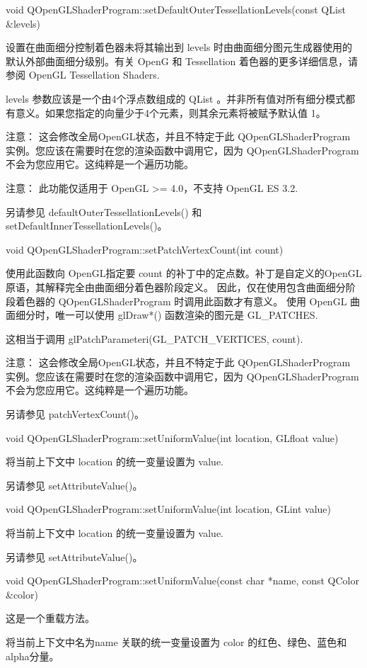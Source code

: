 void QOpenGLShaderProgram::setDefaultOuterTessellationLevels(const QList \&levels)

设置在曲面细分控制着色器未将其输出到 levels 时由曲面细分图元生成器使用的默认外部曲面细分级别。有关 OpenG 和 Tessellation 着色器的更多详细信息，请参阅 OpenGL Tessellation Shaders.

levels 参数应该是一个由4个浮点数组成的 QList 。并非所有值对所有细分模式都有意义。如果您指定的向量少于4个元素，则其余元素将被赋予默认值 1。

注意： 这会修改全局OpenGL状态，并且不特定于此 QOpenGLShaderProgram 实例。您应该在需要时在您的渲染函数中调用它，因为 QOpenGLShaderProgram 不会为您应用它。这纯粹是一个遍历功能。

注意： 此功能仅适用于 OpenGL >= 4.0，不支持 OpenGL ES 3.2.

另请参见 defaultOuterTessellationLevels() 和 setDefaultInnerTessellationLevels()。

void QOpenGLShaderProgram::setPatchVertexCount(int count)

使用此函数向 OpenGL指定要 count 的补丁中的定点数。补丁是自定义的OpenGL原语，其解释完全由曲面细分着色器阶段定义。 因此，仅在使用包含曲面细分阶段着色器的 QOpenGLShaderProgram 时调用此函数才有意义。 使用 OpenGL 曲面细分时，唯一可以使用 glDraw*() 函数渲染的图元是 GL\_PATCHES.

这相当于调用 glPatchParameteri(GL\_PATCH\_VERTICES, count).

注意： 这会修改全局OpenGL状态，并且不特定于此 QOpenGLShaderProgram 实例。您应该在需要时在您的渲染函数中调用它，因为 QOpenGLShaderProgram 不会为您应用它。这纯粹是一个遍历功能。

另请参见 patchVertexCount()。

void QOpenGLShaderProgram::setUniformValue(int location, GLfloat value)

将当前上下文中 location 的统一变量设置为 value.

另请参见 setAttributeValue()。

void QOpenGLShaderProgram::setUniformValue(int location, GLint value)

将当前上下文中 location 的统一变量设置为 value.

另请参见 setAttributeValue()。

void QOpenGLShaderProgram::setUniformValue(const char *name, const QColor \&color)

这是一个重载方法。

将当前上下文中名为name 关联的统一变量设置为 color 的红色、绿色、蓝色和alpha分量。

